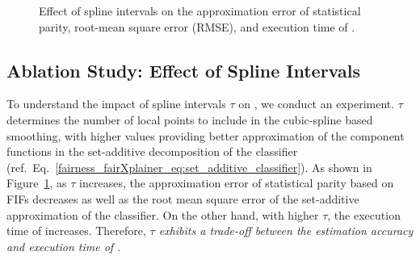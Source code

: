 \begin{figure}
	\caption[Ablation study on FIFs: $ \tau $]{Effect of spline intervals on the approximation error of statistical parity, root-mean square error (RMSE), and  execution time of {\fairXplainer}.}
	\label{fairness_fairXplainer_fig:effect_spline_intervals_appendix}
\end{figure}




\subsection{Ablation Study: Effect of Spline Intervals} 
To understand the impact of spline intervals $\tau$ on {\fairXplainer}, we conduct an experiment. $\tau$ determines the number of local points to include in the cubic-spline based smoothing, with higher values providing better approximation of the component functions in the set-additive decomposition of the classifier (ref.\ Eq.~\eqref{fairness_fairXplainer_eq:set_additive_classifier}). As shown in Figure~\ref{fairness_fairXplainer_fig:effect_spline_intervals_appendix}, as $\tau$ increases, the approximation error of statistical parity based on FIFs decreases as well as the root mean square error of the set-additive approximation of the classifier. On the other hand, with higher $ \tau $, the execution time of {\fairXplainer} increases. Therefore, \emph{$ \tau $ exhibits a trade-off between the estimation accuracy and execution time of {\fairXplainer}.}

